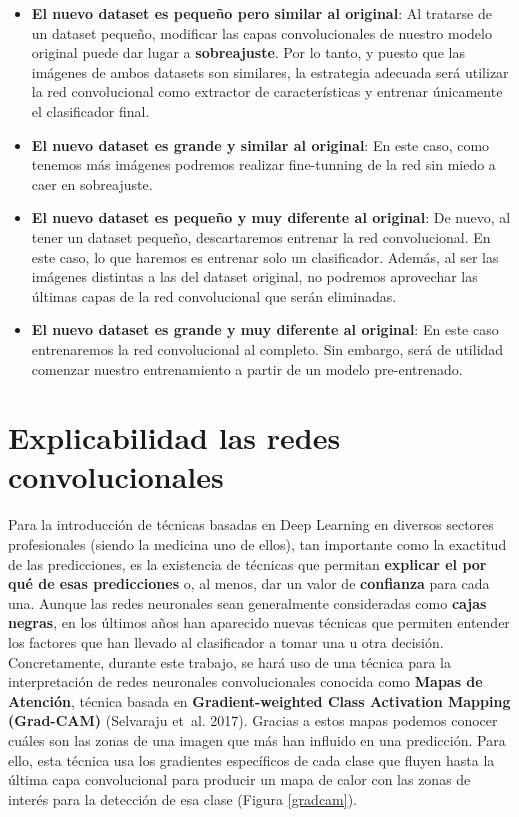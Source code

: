 \documentclass[
  12pt,
  spanish,
  a4paperpaper,
]{report}
\providecommand{\tightlist}{%
  \setlength{\itemsep}{0pt}\setlength{\parskip}{0pt}}
\begin{document}
\begin{itemize}
\tightlist
\item
  \textbf{El nuevo dataset es pequeño pero similar al original}: Al
  tratarse de un dataset pequeño, modificar las capas convolucionales de
  nuestro modelo original puede dar lugar a \textbf{sobreajuste}. Por lo
  tanto, y puesto que las imágenes de ambos datasets son similares, la
  estrategia adecuada será utilizar la red convolucional como extractor
  de características y entrenar únicamente el clasificador final.
\item
  \textbf{El nuevo dataset es grande y similar al original}: En este
  caso, como tenemos más imágenes podremos realizar fine-tunning de la
  red sin miedo a caer en sobreajuste.
\item
  \textbf{El nuevo dataset es pequeño y muy diferente al original}: De
  nuevo, al tener un dataset pequeño, descartaremos entrenar la red
  convolucional. En este caso, lo que haremos es entrenar solo un
  clasificador. Además, al ser las imágenes distintas a las del dataset
  original, no podremos aprovechar las últimas capas de la red
  convolucional que serán eliminadas.
\item
  \textbf{El nuevo dataset es grande y muy diferente al original}: En
  este caso entrenaremos la red convolucional al completo. Sin embargo,
  será de utilidad comenzar nuestro entrenamiento a partir de un modelo
  pre-entrenado.
\end{itemize}

\newpage

\hypertarget{explicabilidad-las-redes-convolucionales}{%
\section{Explicabilidad las redes
convolucionales}\label{explicabilidad-las-redes-convolucionales}}

Para la introducción de técnicas basadas en Deep Learning en diversos
sectores profesionales (siendo la medicina uno de ellos), tan importante
como la exactitud de las predicciones, es la existencia de técnicas que
permitan \textbf{explicar el por qué de esas predicciones} o, al menos,
dar un valor de \textbf{confianza} para cada una. Aunque las redes
neuronales sean generalmente consideradas como \textbf{cajas negras}, en
los últimos años han aparecido nuevas técnicas que permiten entender los
factores que han llevado al clasificador a tomar una u otra decisión.
Concretamente, durante este trabajo, se hará uso de una técnica para la
interpretación de redes neuronales convolucionales conocida como
\textbf{Mapas de Atención}, técnica basada en \textbf{Gradient-weighted
Class Activation Mapping (Grad-CAM)} (Selvaraju et~al. 2017). Gracias a
estos mapas podemos conocer cuáles son las zonas de una imagen que más
han influido en una predicción. Para ello, esta técnica usa los
gradientes específicos de cada clase que fluyen hasta la última capa
convolucional para producir un mapa de calor con las zonas de interés
para la detección de esa clase (Figura \ref{gradcam}).
\end{document}
